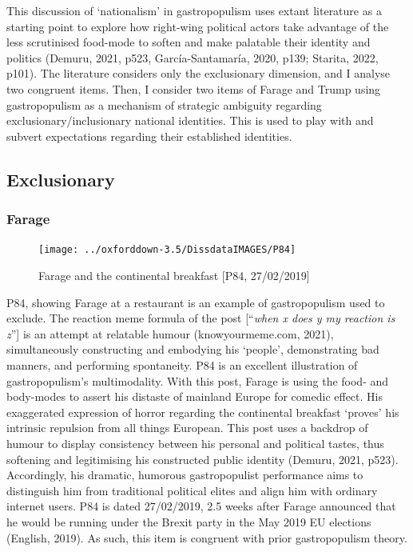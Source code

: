 \documentclass[a4paper, nobind]{templates/ociamthesis}
\begin{document}
This discussion of `nationalism' in gastropopulism uses extant literature as a starting point to explore how right-wing political actors take advantage of the less scrutinised food-mode to soften and make palatable their identity and politics (Demuru, 2021, p523, García-Santamaría, 2020, p139; Starita, 2022, p101). The literature considers only the exclusionary dimension, and I analyse two congruent items. Then, I consider two items of Farage and Trump using gastropopulism as a mechanism of strategic ambiguity regarding exclusionary/inclusionary national identities. This is used to play with and subvert expectations regarding their established identities.

\hypertarget{exclusionary}{%
\subsection{Exclusionary}\label{exclusionary}}

\hypertarget{farage-1}{%
\subsubsection*{Farage}\label{farage-1}}

\begin{figure}
\texttt{[image: ../oxforddown-3.5/DissdataIMAGES/P84]} \caption{Farage and the continental breakfast [P84, 27/02/2019]}\label{fig:unnamed-chunk-17}
\end{figure}

P84, showing Farage at a restaurant is an example of gastropopulism used to exclude.
The reaction meme formula of the post {[}``\emph{when x does y my reaction is z}''{]} is an attempt at relatable humour (knowyourmeme.com, 2021), simultaneously constructing and embodying his `people', demonstrating bad manners, and performing spontaneity.
P84 is an excellent illustration of gastropopulism's multimodality.
With this post, Farage is using the food- and body-modes to assert his distaste of mainland Europe for comedic effect.
His exaggerated expression of horror regarding the continental breakfast `proves' his intrinsic repulsion from all things European.
This post uses a backdrop of humour to display consistency between his personal and political tastes, thus softening and legitimising his constructed public identity (Demuru, 2021, p523).
Accordingly, his dramatic, humorous gastropopulist performance aims to distinguish him from traditional political elites and align him with ordinary internet users.
P84 is dated 27/02/2019, 2.5 weeks after Farage announced that he would be running under the Brexit party in the May 2019 EU elections (English, 2019).
As such, this item is congruent with prior gastropopulism theory.
\end{document}
